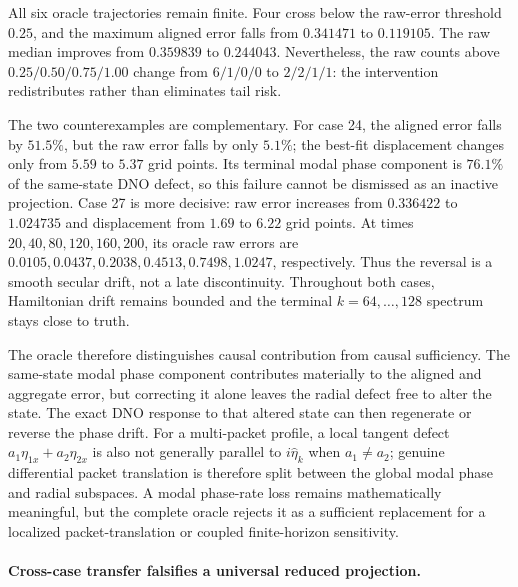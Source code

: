 \documentclass[11pt]{article}
\begin{document}
All six oracle trajectories remain finite.  Four cross below the raw-error
threshold $0.25$, and the maximum aligned error falls from $0.341471$ to
$0.119105$.  The raw median improves from $0.359839$ to $0.244043$.
Nevertheless, the raw counts above $0.25/0.50/0.75/1.00$ change from
$6/1/0/0$ to $2/2/1/1$: the intervention redistributes rather than eliminates
tail risk.

The two counterexamples are complementary.  For case 24, the aligned error
falls by $51.5\%$, but the raw error falls by only $5.1\%$; the best-fit
displacement changes only from $5.59$ to $5.37$ grid points.  Its terminal
modal phase component is $76.1\%$ of the same-state DNO defect, so this failure
cannot be dismissed as an inactive projection.  Case 27 is more decisive: raw
error increases from $0.336422$ to $1.024735$ and displacement from $1.69$ to
$6.22$ grid points.  At times $20,40,80,120,160,200$, its oracle raw errors are
$0.0105,0.0437,0.2038,0.4513,0.7498,1.0247$, respectively.  Thus the reversal
is a smooth secular drift, not a late discontinuity.  Throughout both cases,
Hamiltonian drift remains bounded and the terminal $k=64,\ldots,128$ spectrum
stays close to truth.

The oracle therefore distinguishes causal contribution from causal
sufficiency.  The same-state modal phase component contributes materially to
the aligned and aggregate error, but correcting it alone leaves the radial
defect free to alter the state.  The exact DNO response to that altered state
can then regenerate or reverse the phase drift.  For a multi-packet profile,
a local tangent defect $a_1\eta_{1x}+a_2\eta_{2x}$ is also not generally
parallel to $i\widehat\eta_k$ when $a_1\ne a_2$; genuine differential packet
translation is therefore split between the global modal phase and radial
subspaces.  A modal phase-rate loss remains mathematically meaningful, but the
complete oracle rejects it as a sufficient replacement for a localized
packet-translation or coupled finite-horizon sensitivity.

\paragraph{Cross-case transfer falsifies a universal reduced projection.}
\end{document}
